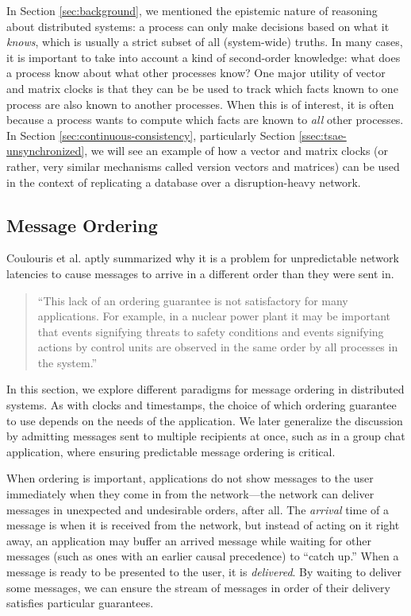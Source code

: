 \documentclass[]             %
{NASA}                       %
\theoremstyle{definition}
\begin{document}
In Section \ref{sec:background}, we mentioned the epistemic nature of
reasoning about distributed systems: a process can only make decisions
based on what it \emph{knows}, which is usually a strict subset of all
(system-wide) truths. In many cases, it is important to take into
account a kind of second-order knowledge: what does a process know
about what other processes know? One major utility of vector and
matrix clocks is that they can be be used to track which facts known
to one process are also known to another processes. When this is of
interest, it is often because a process wants to compute which facts
are known to \emph{all} other processes. In Section
\ref{sec:continuous-consistency}, particularly Section
\ref{ssec:tsae-unsynchronized}, we will see an example of how a
vector and matrix clocks (or rather, very similar mechanisms called
version vectors and matrices) can be used in the context of
replicating a database over a disruption-heavy network.

\subsection{Message Ordering}
\label{ssec:message-ordering}
Coulouris et al. \cite{coulouris2005distributed} aptly summarized why
it is a problem for unpredictable network latencies to cause messages
to arrive in a different order than they were sent in.
\begin{quote}
  ``This lack of an ordering guarantee is not satisfactory for many
  applications. For example, in a nuclear power plant it may be
  important that events signifying threats to safety conditions and
  events signifying actions by control units are observed in the same
  order by all processes in the system.''
\end{quote}
In this section, we explore different paradigms for message ordering
in distributed systems. As with clocks and timestamps, the choice of
which ordering guarantee to use depends on the needs of the
application. We later generalize the discussion by admitting messages
sent to multiple recipients at once, such as in a group chat
application, where ensuring predictable message ordering is critical.

When ordering is important, applications do not show messages to the
user immediately when they come in from the network---the network can
deliver messages in unexpected and undesirable orders, after all. The
\emph{arrival} time of a message is when it is received from the
network, but instead of acting on it right away, an application may
buffer an arrived message while waiting for other messages (such as
ones with an earlier causal precedence) to ``catch up.'' When a
message is ready to be presented to the user, it is
\emph{delivered}. By waiting to deliver some messages, we can ensure
the stream of messages in order of their delivery satisfies particular
guarantees.
\end{document}
